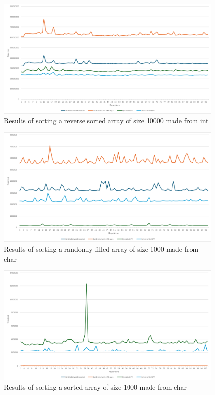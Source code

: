\documentclass{article}
\begin{document}
\begin{figure}[!h]
    \centering
    \includegraphics[width=0.7\linewidth]{int_10000_reverse_sorted.png}
    \caption{Results of sorting a reverse sorted array of size 10000 made from int}
    \label{fig:int_10000_reverse_sorted}
\end{figure}


\begin{figure}[!h]
    \centering
    \includegraphics[width=0.7\linewidth]{char_1000_random.png}
    \caption{Results of sorting a randomly filled array of size 1000 made from char}
    \label{fig:char_1000_random}
\end{figure}

\begin{figure}[!h]
    \centering
    \includegraphics[width=0.7\linewidth]{char_1000_sorted.png}
    \caption{Results of sorting a sorted array of size 1000 made from char}
    \label{fig:char_1000_sorted}
\end{figure}
\end{document}
